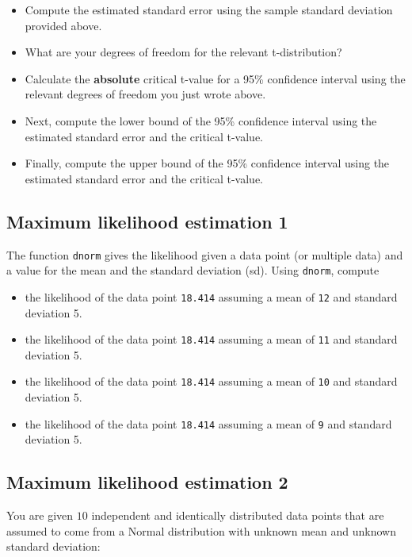 \documentclass[12pt,]{krantz}
\providecommand{\tightlist}{%
  \setlength{\itemsep}{0pt}\setlength{\parskip}{0pt}}
\begin{document}
\begin{itemize}
\tightlist
\item
  Compute the estimated standard error using the sample standard deviation provided above.
\item
  What are your degrees of freedom for the relevant t-distribution?
\item
  Calculate the \textbf{absolute} critical t-value for a 95\% confidence interval using the relevant degrees of freedom you just wrote above.
\item
  Next, compute the lower bound of the 95\% confidence interval using the estimated standard error and the critical t-value.
\item
  Finally, compute the upper bound of the 95\% confidence interval using the estimated standard error and the critical t-value.
\end{itemize}

\hypertarget{sec:FoundationsexercisesMLE1}{%
\subsection{Maximum likelihood estimation 1}\label{sec:FoundationsexercisesMLE1}}

The function \texttt{dnorm} gives the likelihood given a data point (or multiple data) and a value for the mean and the standard deviation (sd). Using \texttt{dnorm}, compute

\begin{itemize}
\tightlist
\item
  the likelihood of the data point \texttt{18.414} assuming a mean of \texttt{12} and standard deviation 5.
\item
  the likelihood of the data point \texttt{18.414} assuming a mean of \texttt{11} and standard deviation 5.
\item
  the likelihood of the data point \texttt{18.414} assuming a mean of \texttt{10} and standard deviation 5.
\item
  the likelihood of the data point \texttt{18.414} assuming a mean of \texttt{9} and standard deviation 5.
\end{itemize}

\hypertarget{sec:FoundationsexercisesMLE2}{%
\subsection{Maximum likelihood estimation 2}\label{sec:FoundationsexercisesMLE2}}

You are given \(10\) independent and identically distributed data points that are assumed to come from a Normal distribution with unknown mean and unknown standard deviation:
\end{document}
